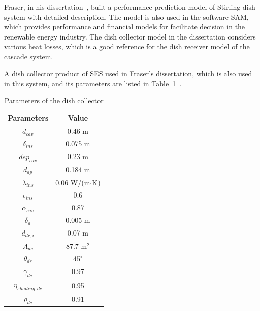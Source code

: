 \documentclass{article}
\begin{document}
Fraser, in his dissertation~\cite{Fraser2008}, built a performance prediction model of Stirling dish system with detailed description. The model is also used in the software SAM, which provides performance and financial models for facilitate decision in the renewable energy industry. The dish collector model in the dissertation considers various heat losses, which is a good reference for the dish receiver model of the cascade system. 

A dish collector product of SES used in Fraser's dissertation, which is also used in this system, and its parameters are listed in Table~\ref{tab:dishCollector}~\cite{Fraser2008}. 

\begin{table}[htbp]
	\caption{Parameters of the dish collector}
	\begin{center}
	\begin{tabular}{cc}
		\toprule
		Parameters	&	Value\\
		\midrule
		$d_{cav}$	&	0.46 m\\
		$\delta_{ins}$	&	0.075 m\\
		$dep_{cav}$	&	0.23 m\\
		$d_{ap}$	&	0.184 m\\
		$\lambda_{ins}$	&	0.06 W/(m$\cdot$K)\\
		$\epsilon_{ins}$	&	0.6\\
		$\alpha_{cav}$	&	0.87\\
		$\delta_a$	&	0.005 m\\
		$d_{dr,i}$	&	0.07 m\\
		$A_{dc}$	&	87.7 m$^2$\\
		$\theta_{dr}$	&	45$^\circ$\\
		$\gamma_{dc}$	&	0.97\\
		$\eta_{shading,dc}$	&	0.95\\
		$\rho_{dc}$	&	0.91\\
		\bottomrule
	\end{tabular}
	\end{center}
	\label{tab:dishCollector}
\end{table}
\end{document}
